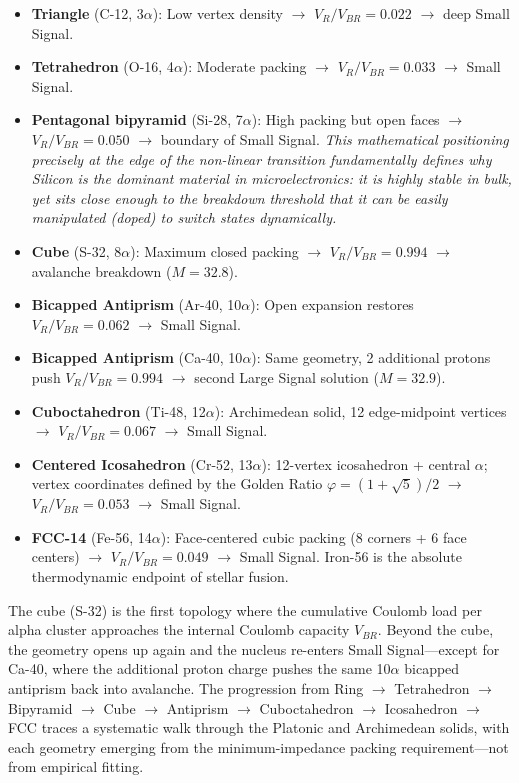 \begin{itemize}
    \item \textbf{Triangle} (C-12, 3$\alpha$): Low vertex density $\rightarrow$ $V_R/V_{BR} = 0.022$ $\rightarrow$ deep Small Signal.
    \item \textbf{Tetrahedron} (O-16, 4$\alpha$): Moderate packing $\rightarrow$ $V_R/V_{BR} = 0.033$ $\rightarrow$ Small Signal.
    \item \textbf{Pentagonal bipyramid} (Si-28, 7$\alpha$): High packing but open faces $\rightarrow$ $V_R/V_{BR} = 0.050$ $\rightarrow$ boundary of Small Signal. \textit{This mathematical positioning precisely at the edge of the non-linear transition fundamentally defines why Silicon is the dominant material in microelectronics: it is highly stable in bulk, yet sits close enough to the breakdown threshold that it can be easily manipulated (doped) to switch states dynamically.}
    \item \textbf{Cube} (S-32, 8$\alpha$): Maximum closed packing $\rightarrow$ $V_R/V_{BR} = 0.994$ $\rightarrow$ avalanche breakdown ($M = 32.8$).
    \item \textbf{Bicapped Antiprism} (Ar-40, 10$\alpha$): Open expansion restores $V_R/V_{BR} = 0.062$ $\rightarrow$ Small Signal.
    \item \textbf{Bicapped Antiprism} (Ca-40, 10$\alpha$): Same geometry, 2 additional protons push $V_R/V_{BR} = 0.994$ $\rightarrow$ second Large Signal solution ($M = 32.9$).
    \item \textbf{Cuboctahedron} (Ti-48, 12$\alpha$): Archimedean solid, 12 edge-midpoint vertices $\rightarrow$ $V_R/V_{BR} = 0.067$ $\rightarrow$ Small Signal.
    \item \textbf{Centered Icosahedron} (Cr-52, 13$\alpha$): 12-vertex icosahedron + central $\alpha$; vertex coordinates defined by the Golden Ratio $\varphi = (1+\sqrt{5})/2$ $\rightarrow$ $V_R/V_{BR} = 0.053$ $\rightarrow$ Small Signal.
    \item \textbf{FCC-14} (Fe-56, 14$\alpha$): Face-centered cubic packing (8 corners + 6 face centers) $\rightarrow$ $V_R/V_{BR} = 0.049$ $\rightarrow$ Small Signal. Iron-56 is the absolute thermodynamic endpoint of stellar fusion.
\end{itemize}

The cube (S-32) is the first topology where the cumulative Coulomb load per alpha cluster approaches the internal Coulomb capacity $V_{BR}$. Beyond the cube, the geometry opens up again and the nucleus re-enters Small Signal---except for Ca-40, where the additional proton charge pushes the same 10$\alpha$ bicapped antiprism back into avalanche. The progression from Ring $\rightarrow$ Tetrahedron $\rightarrow$ Bipyramid $\rightarrow$ Cube $\rightarrow$ Antiprism $\rightarrow$ Cuboctahedron $\rightarrow$ Icosahedron $\rightarrow$ FCC traces a systematic walk through the Platonic and Archimedean solids, with each geometry emerging from the minimum-impedance packing requirement---not from empirical fitting.

